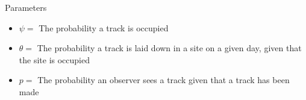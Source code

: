 \documentclass{beamer}
\begin{document}
\begin{frame}{Parameters}
	\begin{itemize}
		\item $\psi=$ The probability a track is occupied
		\item $\theta=$ The probability a track is laid down in a site on a
		given day, given that the site is occupied
		\item $p= $ The probability an observer sees a track given that a track
		has been made
	\end{itemize}
	\begin{center}
	\end{center}
\end{frame}
\end{document}
